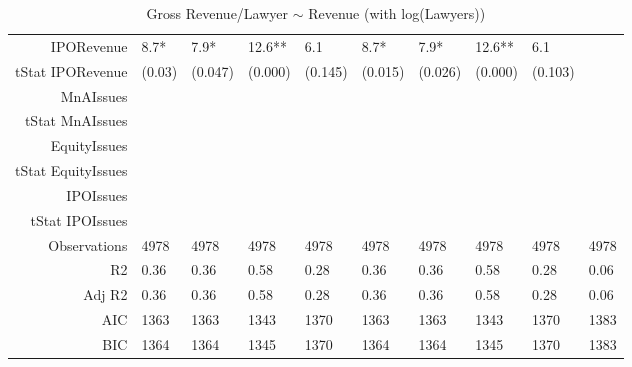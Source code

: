 \begin{table}[ht]
\begin{tabular}{rlllllllll}
  IPORevenue & 8.7* & 7.9* & 12.6** & 6.1 & 8.7* & 7.9* & 12.6** & 6.1 &  \\ 
  tStat IPORevenue & (0.03) & (0.047) & (0.000) & (0.145) & (0.015) & (0.026) & (0.000) & (0.103) &  \\ 
  MnAIssues &  &  &  &  &  &  &  &  &  \\ 
  tStat MnAIssues &  &  &  &  &  &  &  &  &  \\ 
  EquityIssues &  &  &  &  &  &  &  &  &  \\ 
  tStat EquityIssues &  &  &  &  &  &  &  &  &  \\ 
  IPOIssues &  &  &  &  &  &  &  &  &  \\ 
  tStat IPOIssues &  &  &  &  &  &  &  &  &  \\ 
  Observations & 4978 & 4978 & 4978 & 4978 & 4978 & 4978 & 4978 & 4978 & 4978 \\ 
  R2 & 0.36 & 0.36 & 0.58 & 0.28 & 0.36 & 0.36 & 0.58 & 0.28 & 0.06 \\ 
  Adj R2 & 0.36 & 0.36 & 0.58 & 0.28 & 0.36 & 0.36 & 0.58 & 0.28 & 0.06 \\ 
  AIC & 1363 & 1363 & 1343 & 1370 & 1363 & 1363 & 1343 & 1370 & 1383 \\ 
  BIC & 1364 & 1364 & 1345 & 1370 & 1364 & 1364 & 1345 & 1370 & 1383 \\ 
   \hline
\end{tabular}
\caption{Gross Revenue/Lawyer $\sim$ Revenue (with log(Lawyers))} 
\end{table}
